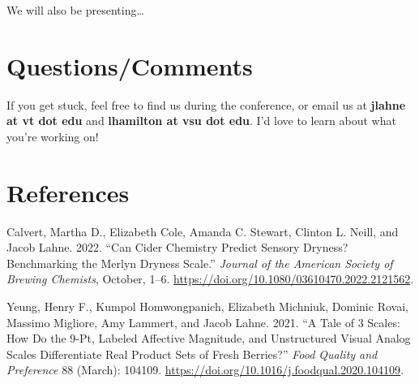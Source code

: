 \documentclass[
]{book}
\newlength{\cslhangindent}
\newlength{\cslentryspacingunit} %
\newenvironment{CSLReferences}[2] %
 {%
  \setlength{\parindent}{0pt}
  \ifodd #1
  \let\oldpar\par
  \def\par{\hangindent=\cslhangindent\oldpar}
  \fi
  \setlength{\parskip}{#2\cslentryspacingunit}
 }%
 {}
\begin{document}
We will also be presenting\ldots{}

\hypertarget{questionscomments}{%
\section{Questions/Comments}\label{questionscomments}}

If you get stuck, feel free to find us during the conference, or email us at \textbf{jlahne at vt dot edu} and \textbf{lhamilton at vsu dot edu}. I'd love to learn about what you're working on!

\hypertarget{references}{%
\section{References}\label{references}}

\hypertarget{refs}{}
\begin{CSLReferences}{1}{0}
\leavevmode{}%
Calvert, Martha D., Elizabeth Cole, Amanda C. Stewart, Clinton L. Neill, and Jacob Lahne. 2022. {``Can {Cider Chemistry Predict Sensory Dryness}? {Benchmarking} the {Merlyn Dryness Scale}.''} \emph{Journal of the American Society of Brewing Chemists}, October, 1--6. \url{https://doi.org/10.1080/03610470.2022.2121562}.

\leavevmode{}%
Yeung, Henry F., Kumpol Homwongpanich, Elizabeth Michniuk, Dominic Rovai, Massimo Migliore, Amy Lammert, and Jacob Lahne. 2021. {``A Tale of 3 Scales: {How} Do the 9-Pt, {Labeled Affective Magnitude}, and Unstructured {Visual Analog} Scales Differentiate Real Product Sets of Fresh Berries?''} \emph{Food Quality and Preference} 88 (March): 104109. \url{https://doi.org/10.1016/j.foodqual.2020.104109}.

\end{CSLReferences}
\end{document}
